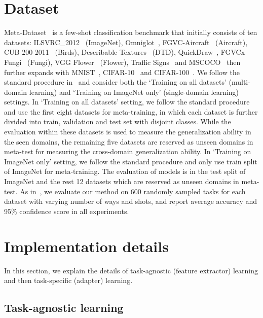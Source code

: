 
\section{Dataset}
Meta-Dataset~\cite{triantafillou2019meta} is a few-shot classification benchmark that initially consists of ten datasets: ILSVRC\_2012~\cite{russakovsky2015imagenet} (ImageNet),  Omniglot~\cite{Lake1332}, FGVC-Aircraft~\cite{maji2013fine} (Aircraft), CUB-200-2011~\cite{wah2011caltech} (Birds), Describable Textures~\cite{cimpoi2014describing} (DTD), QuickDraw~\cite{jongejan2016quick}, FGVCx Fungi~\cite{brigit2018fungi} (Fungi), VGG Flower~\cite{nilsback2008automated} (Flower), Traffic Signs~\cite{houben2013detection} and MSCOCO~\cite{lin2014microsoft} then further expands with MNIST~\cite{lecun1998gradient}, CIFAR-10~\cite{krizhevsky2009learning} and CIFAR-100~\cite{krizhevsky2009learning}. We follow the standard procedure in~\cite{triantafillou2019meta} and consider both the `Training on all datasets' (multi-domain learning) and `Training on ImageNet only' (single-domain learning) settings.
In `Training on all datasets' setting, we follow the standard procedure and use the first eight datasets for meta-training, in which each dataset is further divided into train, validation and test set with disjoint classes. 
While the evaluation within these datasets is used to measure the generalization ability in the seen domains, the remaining five datasets are reserved as unseen domains in meta-test for measuring the cross-domain generalization ability.
In `Training on ImageNet only' setting, we follow the standard procedure and only use train split of ImageNet for meta-training. The evaluation of models is in the test split of ImageNet and the rest 12 datasets which are reserved as unseen domains in meta-test.
As in~\cite{triantafillou2019meta}, we evaluate our method on 600 randomly sampled tasks for each dataset with varying number of ways and shots, and report average accuracy and 95\% confidence score in all experiments.

\section{Implementation details}


In this section, we explain the details of task-agnostic (feature extractor) learning and then task-specific (adapter) learning.


\subsection{Task-agnostic learning}

